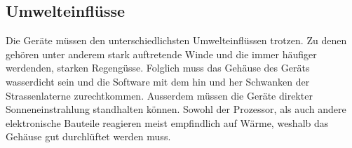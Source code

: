 \subsection{Umwelteinflüsse}
Die Geräte müssen den unterschiedlichsten Umwelteinflüssen trotzen. Zu denen gehören unter anderem stark auftretende Winde und die immer häufiger werdenden, starken Regengüsse. Folglich muss das Gehäuse des Geräts wasserdicht sein und die Software mit dem hin und her Schwanken der Strassenlaterne zurechtkommen. Ausserdem müssen die Geräte direkter Sonneneinstrahlung standhalten können. Sowohl der Prozessor, als auch andere elektronische Bauteile reagieren meist empfindlich auf Wärme, weshalb das Gehäuse gut durchlüftet werden muss.